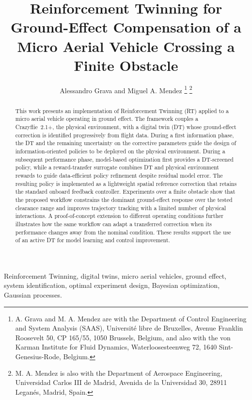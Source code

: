 \documentclass[journal]{IEEEtran}
\begin{document}
\title{Reinforcement Twinning for Ground-Effect Compensation of a Micro Aerial Vehicle Crossing a Finite Obstacle}

\author{Alessandro Grava and Miguel A. Mendez%
\thanks{A. Grava and M. A. Mendez are with the Department of Control Engineering and System Analysis (SAAS), Universit\'e libre de Bruxelles, Avenue Franklin Roosevelt 50, CP 165/55, 1050 Brussels, Belgium, and also with the von Karman Institute for Fluid Dynamics, Waterloosesteenweg 72, 1640 Sint-Genesius-Rode, Belgium.}%
\thanks{M. A. Mendez is also with the Department of Aerospace Engineering, Universidad Carlos III de Madrid, Avenida de la Universidad 30, 28911 Legan\'es, Madrid, Spain.}}

\markboth{}{}
\maketitle

\begin{abstract}This work presents an implementation of Reinforcement Twinning (RT) applied to a micro aerial vehicle operating in ground effect. The framework couples a Crazyflie~2.1+, the physical environment, with a digital twin (DT) whose ground-effect correction is identified progressively from flight data. During a first information phase, the DT and the remaining uncertainty on the corrective parameters guide the design of information-oriented policies to be deployed on the physical environment. During a subsequent performance phase, model-based optimization first provides a DT-screened policy, while a reward-transfer surrogate combines DT and physical environment rewards to guide data-efficient policy refinement despite residual model error. The resulting policy is implemented as a lightweight spatial reference correction that retains the standard onboard feedback controller. Experiments over a finite obstacle show that the proposed workflow constrains the dominant ground-effect response over the tested clearance range and improves trajectory tracking with a limited number of physical interactions. A proof-of-concept extension to different operating conditions further illustrates how the same workflow can adapt a transferred correction when its performance changes away from the nominal condition. These results support the use of an active DT for model learning and control improvement.\end{abstract}

\begin{IEEEkeywords}Reinforcement Twinning, digital twins, micro aerial vehicles, ground effect, system identification, optimal experiment design, Bayesian optimization, Gaussian processes.\end{IEEEkeywords}
\end{document}
